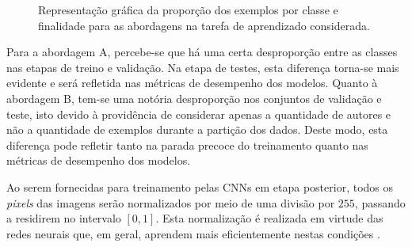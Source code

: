 \begin{figure}[h!]
\centering
\caption{Representação gráfica da proporção dos exemplos por classe e finalidade para as abordagens na tarefa de aprendizado considerada.}
\hfill
{}
\label{fig:dropout}
\end{figure}

Para a abordagem A, percebe-se que há uma certa desproporção entre as classes nas etapas de treino e validação. Na etapa de testes, esta diferença torna-se mais evidente e será refletida nas métricas de desempenho dos modelos. Quanto à abordagem B, tem-se uma notória desproporção nos conjuntos de validação e teste, isto devido à providência de considerar apenas a quantidade de autores e não a quantidade de exemplos durante a partição dos dados. Deste modo, esta diferença pode refletir tanto na parada precoce do treinamento quanto nas métricas de desempenho dos modelos.

Ao serem fornecidas para treinamento pelas CNNs em etapa posterior, todos os \emph{pixels} das imagens serão normalizados por meio de uma divisão por $255$, passando a residirem no intervalo $[0,1]$. Esta normalização é realizada em virtude das redes neurais que, em geral, aprendem mais eficientemente nestas condições \cite{chollet}. 
